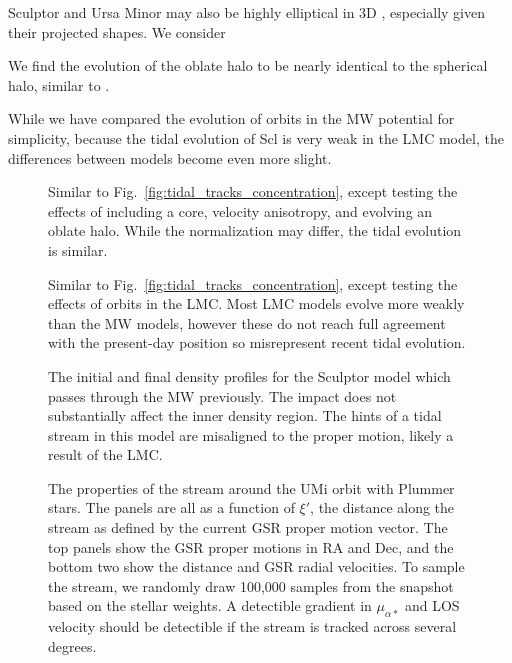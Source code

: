 Sculptor and Ursa Minor may also be highly elliptical in 3D
\citep[e.g.,][]{an+koposov2022}, especially given their projected
shapes. We consider

We find the evolution of the oblate halo to be nearly identical to the
spherical halo, similar to \citet{battaglia+sollima+nipoti2015}.

While we have compared the evolution of orbits in the MW potential for
simplicity, because the tidal evolution of Scl is very weak in the LMC
model, the differences between models become even more slight.

\begin{figure}
\centering
{}
\caption[Tidal dependence on halo structure]{Similar to
Fig.~\ref{fig:tidal_tracks_concentration}, except testing the effects of
including a core, velocity anisotropy, and evolving an oblate halo.
While the normalization may differ, the tidal evolution is
similar.}\label{fig:tidal_tracks_structure}
\end{figure}

\begin{figure}
\centering
{}
\caption[Ursa Minor tidal dependence on orbit]{Similar to
Fig.~\ref{fig:tidal_tracks_concentration}, except testing the effects of
orbits in the LMC. Most LMC models evolve more weakly than the MW
models, however these do not reach full agreement with the present-day
position so misrepresent recent tidal
evolution.}\label{fig:tidal_tracks_umi}
\end{figure}

\begin{figure}
\centering
{}
\caption[Scl MW impact stellar densities]{The initial and final density
profiles for the Sculptor model which passes through the MW previously.
The impact does not substantially affect the inner density region. The
hints of a tidal stream in this model are misaligned to the proper
motion, likely a result of the LMC.}
\end{figure}

\begin{figure}
\centering
{}
\caption[Ursa Minor predicted stream]{The properties of the stream
around the UMi \smallperi{} orbit with Plummer stars. The panels are all
as a function of \(\xi'\), the distance along the stream as defined by
the current GSR proper motion vector. The top panels show the GSR proper
motions in RA and Dec, and the bottom two show the distance and GSR
radial velocities. To sample the stream, we randomly draw 100,000
samples from the snapshot based on the stellar weights. A detectible
gradient in \(\mu_{\alpha*}\) and LOS velocity should be detectible if
the stream is tracked across several
degrees.}\label{fig:umi_tidal_stream}
\end{figure}

